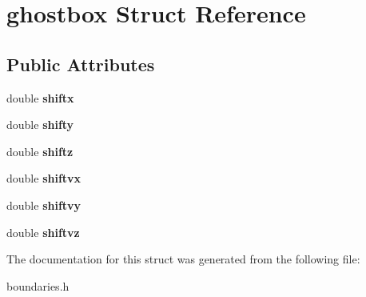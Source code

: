 \hypertarget{structghostbox}{
\section{ghostbox Struct Reference}
\label{structghostbox}
}
\subsection*{Public Attributes}
\begin{DoxyCompactItemize}
\item 
\hypertarget{structghostbox_af35f9b3b33db3c41a012db9450c338ac}{
double {\bfseries shiftx}}
\label{structghostbox_af35f9b3b33db3c41a012db9450c338ac}

\item 
\hypertarget{structghostbox_aff98f662d8fa59199057d1b8bd7498e6}{
double {\bfseries shifty}}
\label{structghostbox_aff98f662d8fa59199057d1b8bd7498e6}

\item 
\hypertarget{structghostbox_a76aa8931e72b73dc9f08a46672cc89e8}{
double {\bfseries shiftz}}
\label{structghostbox_a76aa8931e72b73dc9f08a46672cc89e8}

\item 
\hypertarget{structghostbox_a916d3593a45e0ded559b42406fb6aedd}{
double {\bfseries shiftvx}}
\label{structghostbox_a916d3593a45e0ded559b42406fb6aedd}

\item 
\hypertarget{structghostbox_a398505d5dca95ba8f015674d5a354e09}{
double {\bfseries shiftvy}}
\label{structghostbox_a398505d5dca95ba8f015674d5a354e09}

\item 
\hypertarget{structghostbox_a6b486209fa86fea84cc5e22d8e418456}{
double {\bfseries shiftvz}}
\label{structghostbox_a6b486209fa86fea84cc5e22d8e418456}

\end{DoxyCompactItemize}


The documentation for this struct was generated from the following file:\begin{DoxyCompactItemize}
\item 
boundaries.h\end{DoxyCompactItemize}
